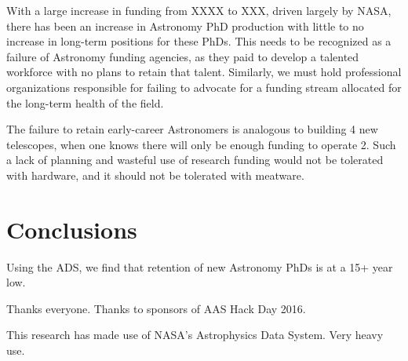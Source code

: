 \documentclass{emulateapj}
\begin{document}
With a large increase in funding from XXXX to XXX, driven largely by NASA, there has been an increase in Astronomy PhD production with little to no increase in long-term positions for these PhDs.  This needs to be recognized as a failure of Astronomy funding agencies, as they paid to develop a talented workforce with no plans to retain that talent. Similarly, we must hold professional organizations responsible for failing to advocate for a funding stream allocated for the long-term health of the field.  

The failure to retain early-career Astronomers is analogous to building 4 new telescopes, when one knows there will only be enough funding to operate 2.  Such a lack of planning and wasteful use of research funding would not be tolerated with hardware, and it should not be tolerated with meatware. 





\section{Conclusions}
Using the ADS, we find that retention of new Astronomy PhDs is at a 15+ year low.  


\acknowledgments
Thanks everyone. Thanks to sponsors of AAS Hack Day 2016.

This research has made use of NASA's Astrophysics Data System. Very heavy use.


\end{document}
